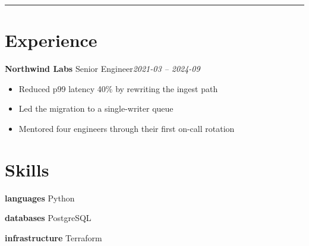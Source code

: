 \documentclass[11pt]{article}
\begin{document}
\par
\vspace{3pt}
\par
\vspace{3pt}
\hrule
\vspace{9pt}
\section*{Experience}
\noindent\textbf{Northwind Labs} \textperiodcentered{} Senior Engineer\hfill\textit{2021-03 -- 2024-09}\\
\par
\begin{itemize}[leftmargin=1.1em,labelsep=0.5em,itemsep=1.5pt,topsep=2pt,parsep=0pt]
  \item Reduced p99 latency 40\% by rewriting the ingest path
  \item Led the migration to a single-writer queue
  \item Mentored four engineers through their first on-call rotation
\end{itemize}
\section*{Skills}
\noindent\textbf{languages} \textbullet{} Python\par
\noindent\textbf{databases} \textbullet{} PostgreSQL\par
\noindent\textbf{infrastructure} \textbullet{} Terraform\par
\end{document}
